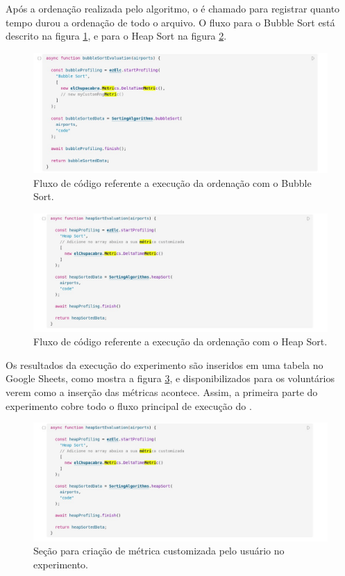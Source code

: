\documentclass[12pt]{tcc}
\begin{document}
	Após a ordenação realizada pelo algoritmo, o  é chamado para registrar quanto tempo durou a ordenação de todo o arquivo. O fluxo para o Bubble Sort está descrito na figura \ref{fig:experimento-bubble}, e para o Heap Sort na figura \ref{fig:experimento-heap}.

	\begin{figure}[!ht]
		\centering
		\includegraphics[width=1\textwidth]{figures/experimento-bubble.jpeg}
		\caption{Fluxo de código referente a execução da ordenação com o Bubble Sort.}
		\label{fig:experimento-bubble}
	\end{figure}

	\begin{figure}[!ht]
		\centering
		\includegraphics[width=1\textwidth]{figures/experimento-heap.jpeg}
		\caption{Fluxo de código referente a execução da ordenação com o Heap Sort.}
		\label{fig:experimento-heap}
	\end{figure}


	Os resultados da execução do experimento são inseridos em uma tabela no Google Sheets, como mostra a figura \ref{fig:experimento-tabela-resultado}, e disponibilizados para os voluntários verem como a inserção das métricas acontece. Assim, a primeira parte do experimento cobre todo o fluxo principal de execução do .

	\begin{figure}[!ht]
		\centering
		\includegraphics[width=1\textwidth]{figures/experimento-heap.jpeg}
		\caption{Seção para criação de métrica customizada pelo usuário no experimento.}
		\label{fig:experimento-tabela-resultado}
	\end{figure}
\end{document}
